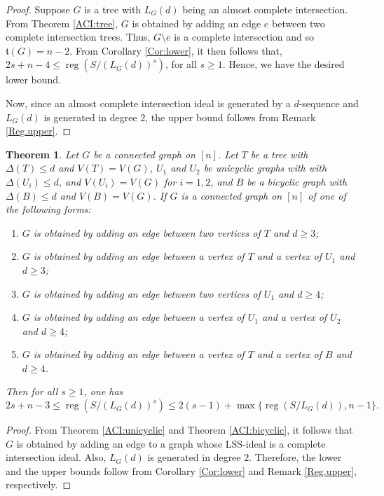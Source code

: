 \documentclass[11pt,a4paper,reqno]{amsart}
\newtheorem{thm}{Theorem}[section]
\theoremstyle{definition}
\numberwithin{equation}{section}
\DeclareMathOperator{\reg}{reg}
\begin{document}

\begin{proof}
    Suppose $G$ is a tree with $L_G(d)$ being an almost complete intersection. From Theorem \ref{ACI:tree},  $G$ is obtained by adding an edge $e$ between two complete intersection trees. Thus, $G\setminus e$ is a complete intersection and so $\mathfrak{t}(G)=n-2$. From Corollary \ref{Cor:lower}, it then follows that, $2s + n-4 \leq \reg (S/(L_G(d))^s)$, for all $s\geq 1$. Hence, we have the desired lower bound. 

    Now, since an almost complete intersection ideal is generated by a $d$-sequence and $L_G(d)$ is generated in degree $2$, the upper bound follows from Remark \ref{Reg.upper}.
\end{proof}









\begin{thm} \label{thm4:ub}
Let $G$ be a connected graph on $[n]$. Let $T$ be a tree with $\Delta(T) \leq d$ and $V(T)=V(G)$, $U_1$ and $U_2$ be unicyclic graphs with with $\Delta(U_i) \leq d$, and $V(U_i)=V(G)$ for $i=1,2$, and $B$ be a bicyclic graph with $\Delta(B) \leq d$ and $V(B)=V(G)$. If $G$ is a connected graph on $[n]$ of one of the following forms: 
    \begin{enumerate}
        \item $G$ is obtained by adding an edge between two vertices of $T$ and $d \geq 3$;
        \item $G$ is obtained by adding an edge between a vertex of $T$ and a vertex of  $U_1$ and $d \geq 3$;
        \item $G$ is obtained by adding an edge between two vertices of $U_1$ and $d \geq 4$;
        \item $G$ is obtained by adding an edge between a vertex of $U_1$ and a vertex of $U_2$ and $d \geq 4$;
        \item  $G$ is obtained by adding an edge between a vertex of $T$ and a vertex of $B$ and $d \geq 4$.
    \end{enumerate}
    Then for all $s\geq 1$, one has 
    $$2s + n-3 \leq \reg (S/(L_G(d))^s) \leq 2(s-1) + \max\{\reg (S/L_{G}(d)), n-1\}.$$
\end{thm}
\begin{proof}
    From Theorem \ref{ACI:unicyclic} and Theorem \ref{ACI:bicyclic}, it follows that $G$ is obtained by adding an edge to a graph whose LSS-ideal is a complete intersection ideal. Also, $L_G(d)$ is generated in degree $2$. Therefore, the lower and the upper bounds follow from Corollary \ref{Cor:lower} and Remark \ref{Reg.upper}, respectively.
\end{proof}
\end{document}
